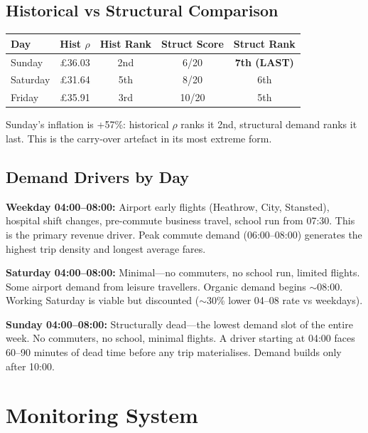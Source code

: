 \documentclass[a4paper,11pt]{article}
\begin{document}
\subsection{Historical vs Structural Comparison}

\begin{tabularx}{\textwidth}{l C C C C}
\toprule
\textbf{Day} & \textbf{Hist $\rho$} & \textbf{Hist Rank} & \textbf{Struct Score} & \textbf{Struct Rank} \\
\midrule
Sunday & \pounds36.03 & 2nd & 6/20 & \textbf{7th (LAST)} \\
Saturday & \pounds31.64 & 5th & 8/20 & 6th \\
Friday & \pounds35.91 & 3rd & 10/20 & 5th \\
\bottomrule
\end{tabularx}

\medskip
Sunday's inflation is +57\%: historical $\rho$ ranks it 2nd, structural demand ranks it last. This is the carry-over artefact in its most extreme form.

\subsection{Demand Drivers by Day}

\textbf{Weekday 04:00--08:00:} Airport early flights (Heathrow, City, Stansted), hospital shift changes, pre-commute business travel, school run from 07:30. This is the primary revenue driver. Peak commute demand (06:00--08:00) generates the highest trip density and longest average fares.

\textbf{Saturday 04:00--08:00:} Minimal---no commuters, no school run, limited flights. Some airport demand from leisure travellers. Organic demand begins $\sim$08:00. Working Saturday is viable but discounted ($\sim$30\% lower 04--08 rate vs weekdays).

\textbf{Sunday 04:00--08:00:} Structurally dead---the lowest demand slot of the entire week. No commuters, no school, minimal flights. A driver starting at 04:00 faces 60--90 minutes of dead time before any trip materialises. Demand builds only after 10:00.

\newpage

\section{Monitoring System}
\end{document}
